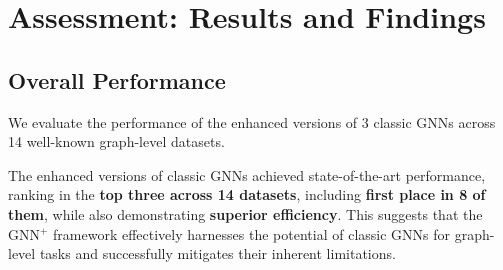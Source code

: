 \vspace{-0.05 in}
\section{Assessment: Results and Findings}



\subsection{Overall Performance}


We evaluate the performance of the enhanced versions of 3 classic GNNs across 14 well-known graph-level datasets.



\begin{tcolorbox}[colback=gray!10, colframe=black, boxrule=1pt, arc=1pt, left=3pt, right=3pt, top=2pt, bottom=2pt]
{
The enhanced versions of classic GNNs achieved state-of-the-art performance, ranking in the \textbf{top three across 14 datasets}, including \textbf{first place in 8 of them}, while also demonstrating \textbf{superior efficiency}. This suggests that the GNN$^+$ framework effectively harnesses the potential of classic GNNs for graph-level tasks and successfully mitigates their inherent limitations.
}
\end{tcolorbox}

